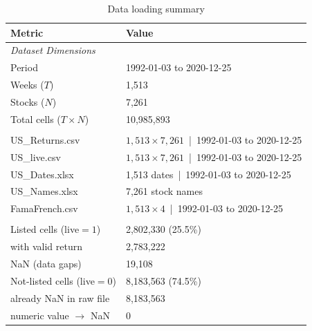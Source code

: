 \begin{table}[ht]
\centering
\caption{Data loading summary}
\label{tab:loading_summary}
\small
\begin{tabular}{l l}
\toprule
\textbf{Metric} & \textbf{Value} \\
\midrule
\multicolumn{2}{l}{\textit{Dataset Dimensions}} \\[2pt]
Period & 1992-01-03 to 2020-12-25 \\
Weeks ($T$) & 1,513 \\
Stocks ($N$) & 7,261 \\
Total cells ($T \times N$) & 10,985,893 \\
\addlinespace
\multicolumn{2}{l}{\textit{Input Files}} \\[2pt]
US\_Returns.csv & $1,513 \times 7,261$ \,|\, 1992-01-03 to 2020-12-25 \\
US\_live.csv & $1,513 \times 7,261$ \,|\, 1992-01-03 to 2020-12-25 \\
US\_Dates.xlsx & 1,513 dates \,|\, 1992-01-03 to 2020-12-25 \\
US\_Names.xlsx & 7,261 stock names \\
FamaFrench.csv & $1,513 \times 4$ \,|\, 1992-01-03 to 2020-12-25 \\
\addlinespace
\multicolumn{2}{l}{\textit{Cleaning Breakdown}} \\[2pt]
Listed cells (live$=1$) & 2,802,330 (25.5\%) \\
\quad with valid return & 2,783,222 \\
\quad NaN (data gaps) & 19,108 \\
Not-listed cells (live$=0$) & 8,183,563 (74.5\%) \\
\quad already NaN in raw file & 8,183,563 \\
\quad numeric value $\to$ NaN & 0 \\
\bottomrule
\end{tabular}
\end{table}
